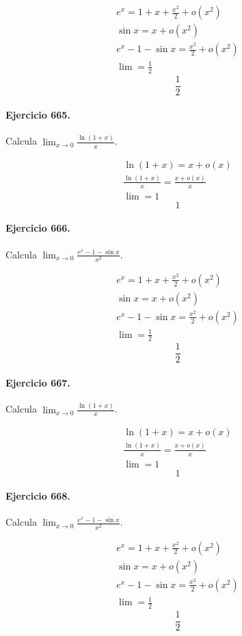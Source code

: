 \documentclass[11pt,a4paper]{article}
\begin{document}
\[
\begin{aligned}
e^x=1+x+\frac{x^2}{2}+o(x^2)\\
\sin x=x+o(x^2)\\
e^x-1-\sin x=\frac{x^2}{2}+o(x^2)\\
\lim=\frac12
\end{aligned}
\]
\[\boxed{\frac12}\]


\paragraph{Ejercicio 665.} Calcula $\displaystyle\lim_{x\to0}\frac{\ln(1+x)}{x}$.

\[
\begin{aligned}
\ln(1+x)=x+o(x)\\
\frac{\ln(1+x)}{x}=\frac{x+o(x)}{x}\\
\lim=1
\end{aligned}
\]
\[\boxed{1}\]


\paragraph{Ejercicio 666.} Calcula $\displaystyle\lim_{x\to0}\frac{e^x-1-\sin x}{x^2}$.

\[
\begin{aligned}
e^x=1+x+\frac{x^2}{2}+o(x^2)\\
\sin x=x+o(x^2)\\
e^x-1-\sin x=\frac{x^2}{2}+o(x^2)\\
\lim=\frac12
\end{aligned}
\]
\[\boxed{\frac12}\]


\paragraph{Ejercicio 667.} Calcula $\displaystyle\lim_{x\to0}\frac{\ln(1+x)}{x}$.

\[
\begin{aligned}
\ln(1+x)=x+o(x)\\
\frac{\ln(1+x)}{x}=\frac{x+o(x)}{x}\\
\lim=1
\end{aligned}
\]
\[\boxed{1}\]


\paragraph{Ejercicio 668.} Calcula $\displaystyle\lim_{x\to0}\frac{e^x-1-\sin x}{x^2}$.

\[
\begin{aligned}
e^x=1+x+\frac{x^2}{2}+o(x^2)\\
\sin x=x+o(x^2)\\
e^x-1-\sin x=\frac{x^2}{2}+o(x^2)\\
\lim=\frac12
\end{aligned}
\]
\[\boxed{\frac12}\]
\end{document}
